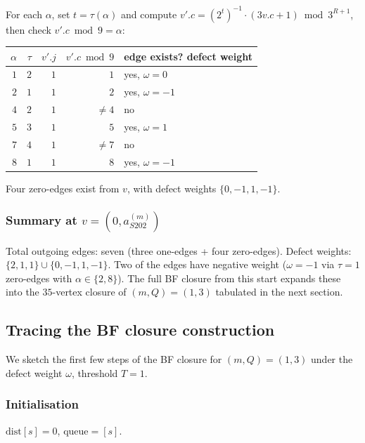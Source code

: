 \documentclass[11pt,a4paper]{article}
\theoremstyle{plain}
\theoremstyle{definition}
\newcommand{\aSat}{a_{S202}^{(m)}}
\begin{document}
For each $\alpha$, set $t = \tau(\alpha)$ and compute
$v'.c = (2^t)^{-1} \cdot (3 v.c + 1) \bmod 3^{R+1}$, then check
$v'.c \bmod 9 = \alpha$:

\begin{center}\footnotesize
\begin{tabular}{rrrr|l}
\toprule
$\alpha$ & $\tau$ & $v'.j$ & $v'.c \bmod 9$ & edge exists? defect weight \\
\midrule
$1$ & $2$ & $1$ & $1$ & yes, $\omega = 0$ \\
$2$ & $1$ & $1$ & $2$ & yes, $\omega = -1$ \\
$4$ & $2$ & $1$ & $\ne 4$ & no \\
$5$ & $3$ & $1$ & $5$ & yes, $\omega = 1$ \\
$7$ & $4$ & $1$ & $\ne 7$ & no \\
$8$ & $1$ & $1$ & $8$ & yes, $\omega = -1$ \\
\bottomrule
\end{tabular}
\end{center}

\noindent Four zero-edges exist from $v$, with defect weights
$\{0, -1, 1, -1\}$.

\subsubsection*{Summary at $v = (0, \aSat)$}

Total outgoing edges: seven (three one-edges + four zero-edges).
Defect weights: $\{2, 1, 1\} \cup \{0, -1, 1, -1\}$. Two of the
edges have negative weight ($\omega = -1$ via $\tau = 1$
zero-edges with $\alpha \in \{2, 8\}$). The full BF closure from
this start expands these into the $35$-vertex closure of
$(m, Q) = (1, 3)$ tabulated in the next section.

\subsection{Tracing the BF closure construction}

We sketch the first few steps of the BF closure for
$(m, Q) = (1, 3)$ under the defect weight $\omega$, threshold
$T = 1$.

\subsubsection*{Initialisation}

$\mathrm{dist}[s] = 0$, $\mathrm{queue} = [s]$.
\end{document}
